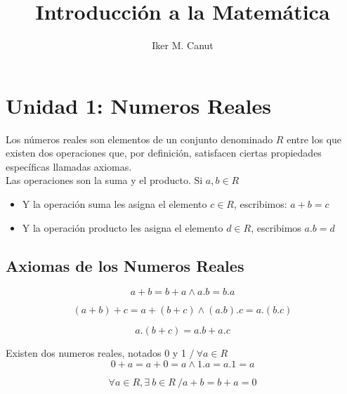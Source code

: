 \documentclass[10pt]{article}
\author{Iker M. Canut}
\begin{document}
\title{Introducción a la Matemática}
\maketitle
\date
\newpage

\tableofcontents
\newpage

\section{Unidad 1: Numeros Reales}
Los números reales son elementos de un conjunto denominado $R$ entre los que existen dos operaciones que, por definición, satisfacen ciertas propiedades específicas llamadas axiomas.\\ Las operaciones son la suma y el producto. Si $a,b \in R$
\begin{itemize}
\item Y la operación suma les asigna el elemento $c \in R$, escribimos: $a+b=c$
\item Y la operación producto les asigna el elemento $d \in R$, escribimos $a.b=d$
\end{itemize}


\subsection{Axiomas de los Numeros Reales}
\begin{axiom}{}
$$a+b=b+a \land a.b=b.a$$
\end{axiom}

\begin{axiom}{}
$$(a+b)+c=a+(b+c) \land (a.b).c=a.(b.c)$$
\end{axiom}

\begin{axiom}{}
$$a.(b+c)=a.b+a.c$$
\end{axiom}

\begin{axiom}{}
Existen dos numeros reales, notados 0 y 1 $/\ \forall a \in R$
$$0+a = a+0 = a \land 1.a = a.1 = a$$
\end{axiom}

\begin{axiom}{}
$$\forall a \in R, \exists\ b \in R\ / a+b = b+a = 0$$
\end{axiom}
\end{document}
